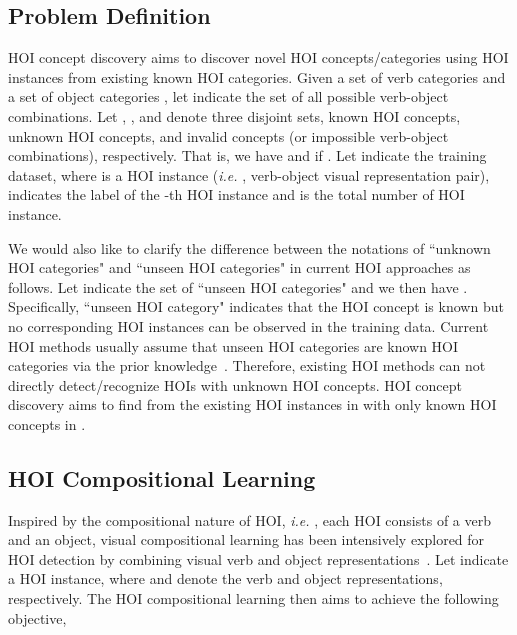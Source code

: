 \documentclass[runningheads]{llncs}
\newcommand{\ie}{\textit{i.e. }}
\begin{document}
\subsection{Problem Definition}

HOI concept discovery aims to discover novel HOI concepts/categories using HOI instances from existing known HOI categories. Given a set of verb categories  and a set of object categories , let  indicate the set of all possible verb-object combinations. Let , , and  denote three disjoint sets, known HOI concepts, unknown HOI concepts, and invalid concepts (or impossible verb-object combinations), respectively. That is, we have  and  if . Let  indicate the training dataset, where  is a HOI instance (\ie, verb-object visual representation pair),  indicates the label of the -th HOI instance and  is the total number of HOI instance.

We would also like to clarify the difference between the notations of ``unknown HOI categories" and ``unseen HOI categories" in current HOI approaches as follows.
Let  indicate the set of ``unseen HOI categories" and we then have .
Specifically, ``unseen HOI category" indicates that the HOI concept is known but no corresponding HOI instances can be observed in the training data. Current HOI methods usually assume that unseen HOI categories  are known HOI categories via the prior knowledge~\cite{shen2018scaling,kato2018compositional,preye2019detecting,bansal2020detecting,hou2020visual}. Therefore, existing HOI methods can not directly detect/recognize HOIs with unknown HOI concepts. HOI concept discovery aims to find  from the existing HOI instances in  with only known HOI concepts in .


\subsection{HOI Compositional Learning}

Inspired by the compositional nature of HOI, \ie, each HOI consists of a verb and an object, visual compositional learning has been intensively explored for HOI detection by combining visual verb and object representations~\cite{kato2018compositional,hou2020visual,hou2021fcl,hou2021atl}. Let  indicate a HOI instance, where  and  denote the verb and object representations, respectively. The HOI compositional learning then aims to achieve the following objective,
\end{document}

